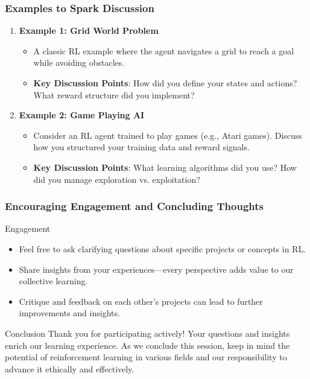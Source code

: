 \documentclass[aspectratio=169]{beamer}
\begin{document}
\begin{frame}[fragile]
    \frametitle{Examples to Spark Discussion}
    \begin{enumerate}
        \item \textbf{Example 1: Grid World Problem}
        \begin{itemize}
            \item A classic RL example where the agent navigates a grid to reach a goal while avoiding obstacles.
            \item \textbf{Key Discussion Points}: How did you define your states and actions? What reward structure did you implement?
        \end{itemize}

        \item \textbf{Example 2: Game Playing AI}
        \begin{itemize}
            \item Consider an RL agent trained to play games (e.g., Atari games). Discuss how you structured your training data and reward signals.
            \item \textbf{Key Discussion Points}: What learning algorithms did you use? How did you manage exploration vs. exploitation?
        \end{itemize}
    \end{enumerate}
\end{frame}

\begin{frame}[fragile]
    \frametitle{Encouraging Engagement and Concluding Thoughts}
    \begin{block}{Engagement}
        \begin{itemize}
            \item Feel free to ask clarifying questions about specific projects or concepts in RL.
            \item Share insights from your experiences—every perspective adds value to our collective learning.
            \item Critique and feedback on each other's projects can lead to further improvements and insights.
        \end{itemize}
    \end{block}

    \begin{block}{Conclusion}
        Thank you for participating actively! Your questions and insights enrich our learning experience. As we conclude this session, keep in mind the potential of reinforcement learning in various fields and our responsibility to advance it ethically and effectively.
    \end{block}
\end{frame}
\end{document}
